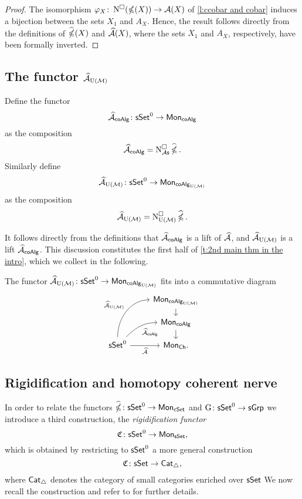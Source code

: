 \begin{proof}
	The isomorphism $\varphi_X \colon \cchains(\ccobar(X))\to \A(X)$
	of \cref{l:ccobar and cobar} induces a bijection between the sets
	$X_1$ and $A_X$.
	Hence, the result follows directly from the definitions of $\ccobarE(X)$ and $\Ahat(X)$, where the sets $X_1$ and $A_X$, respectively, have been formally inverted.
\end{proof}

\subsection{The functor $\Ahat_{\UM}$} \label{s:ahatum}

Define the functor
\[
\Ahat_{\coAlg} \colon \sSet^0 \to \Mon_{\coAlg}
\]
as the composition
\[
\Ahat_{\coAlg} = \cchainsAs \ccobarE.
\]
Similarly define
\[
\Ahat_{\UM} \colon \sSet^0 \to \Mon_{\coAlg_{\UM}}
\]
as the composition
\[
\Ahat_{\UM} = \cchainsUM \ccobarE.
\]

It follows directly from the definitions that $\Ahat_{\coAlg}$ is a lift of $\Ahat$, and $\Ahat_{\UM}$ is a lift $\Ahat_{\coAlg}$.
This discussion constitutes the first half of \cref{t:2nd main thm in the intro}, which we collect in the following.

\begin{lemma}
The functor $\Ahat_\UM \colon \sSet^0 \to \Mon_{\coAlg_\UM}$ fits into a commutative diagram
	\[
	\begin{tikzcd}[row sep=small]
	& \Mon_{\coAlg_\UM} \arrow[d] \\
	& \Mon_{\coAlg} \arrow[d] \\
	\sSet^0
	\arrow[r, "\Ahat"', ]
	\arrow[ru, "\Ahat_{\coAlg}"', out=45, in=180]
	\arrow[ruu, "\Ahat_\UM", out=90, in=180]
	& \Mon_{\Ch}.
	\end{tikzcd}
	\]
\end{lemma}

\subsection{Rigidification and homotopy coherent nerve}

In order to relate the functors $\ccobarE \colon \sSet^0 \to \Mon_{\cSet}$ and $\kan \colon \sSet^0\to \sGrp$ we introduce a third construction, the \textit{rigidification functor}
\[
\rigid \colon \sSet^0 \to \Mon_{\sSet},
\]
which is obtained by restricting to $\sSet^0$ a more general construction
\[
\rigid \colon \sSet \to \Cat_{\simplex},
\]
where $\Cat_{\simplex}$ denotes the category of small categories enriched over $\sSet$
We now recall the construction and refer to \cite{dugger2011rigidification} for further details.

